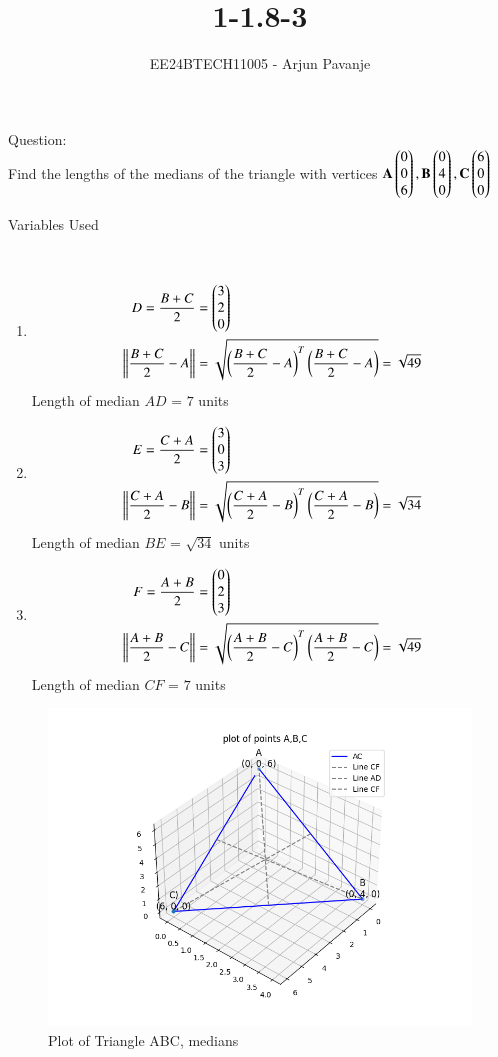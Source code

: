 \documentclass[journal]{IEEEtran}
\begin{document}

\vspace{3cm}

\title{1-1.8-3}
\author{EE24BTECH11005 - Arjun Pavanje
}
{\let\newpage\relax\maketitle}
Question:\\
Find the lengths of the medians of the triangle with vertices $\mathbf{A}\begin{pmatrix}0\\0\\6\end{pmatrix},\mathbf{B}\begin{pmatrix}0\\4\\0\end{pmatrix},\mathbf{C}\begin{pmatrix}6\\0\\0\end{pmatrix}$\\
\solution
\begin{table}[h!]    
  \centering
  
  \caption{Variables Used}
  \label{tab1-1.5-29}
\end{table}\\
\begin{enumerate}
	\item
\begin{align}
	D = \frac{B+C}{2} &= \begin{pmatrix}
		3\\
		2\\
		0
	\end{pmatrix}\\
	\left\lVert\frac{B+C}{2}-A\right\rVert &= \sqrt{\left(\frac{B+C}{2}-A\right)^T \left(\frac{B+C}{2}-A\right)} = \sqrt{49}
\end{align}
Length of median $AD$ = $7$ units
\item
\begin{align}
	E = \frac{C+A}{2} &= \begin{pmatrix}
		3\\
		0\\
		3
	\end{pmatrix}\\
	\left\lVert\frac{C+A}{2}-B\right\rVert &= \sqrt{\left(\frac{C+A}{2}-B\right)^T \left(\frac{C+A}{2}-B\right)} = \sqrt{34}
\end{align}
Length of median $BE$ = $\sqrt{34}$ units
\item
\begin{align}
	F = \frac{A+B}{2} &= \begin{pmatrix}
		0\\
		2\\
		3
	\end{pmatrix}\\
	\left\lVert\frac{A+B}{2}-C\right\rVert &= \sqrt{\left(\frac{A+B}{2}-C\right)^T \left(\frac{A+B}{2}-C\right)} = \sqrt{49}
\end{align}
Length of median $CF$ = $7$ units
		\end{enumerate}
\begin{figure}[h!]
   \centering
   \includegraphics[width = 0.7\linewidth]{figs/fig.png}
   \caption{Plot of Triangle ABC, medians}
   \label{stemplot}
\end{figure}
\end{document}

